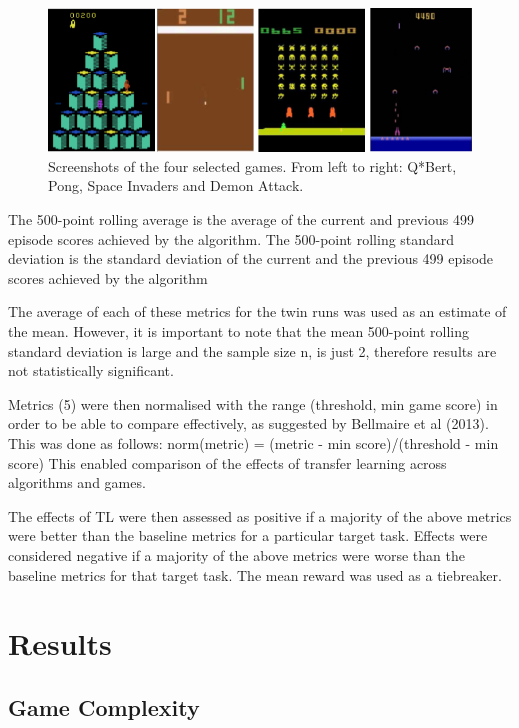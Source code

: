 \begin{figure}[h]
	\includegraphics[width=\textwidth]{fig6.png} 
	\caption{Screenshots of the four selected games. From left to right: Q*Bert, Pong, Space Invaders and Demon Attack.}
\end{figure}

The 500-point rolling average is the average of the current and previous 499 episode scores achieved by the algorithm. The 500-point rolling standard deviation is the standard deviation of the current and the previous 499 episode scores achieved by the algorithm

The average of each of these metrics for the twin runs was used as an estimate of the mean. However, it is important to note that the mean 500-point rolling standard deviation is large and the sample size n, is just 2, therefore results are not statistically significant. 

Metrics (5) were then normalised with the range (threshold, min game score) in order to be able to compare effectively, as suggested by Bellmaire et al (2013). This was done as follows: norm(metric) = (metric - min score)/(threshold - min score) 
This enabled comparison of the effects of transfer learning across algorithms and games.

The effects of TL were then assessed as positive if a majority of the above metrics were better than the baseline metrics for a particular target task. Effects were considered negative if a majority of the above metrics were worse than the baseline metrics for that target task. The mean reward was used as a tiebreaker.



\section{Results}

\subsection*{Game Complexity}

